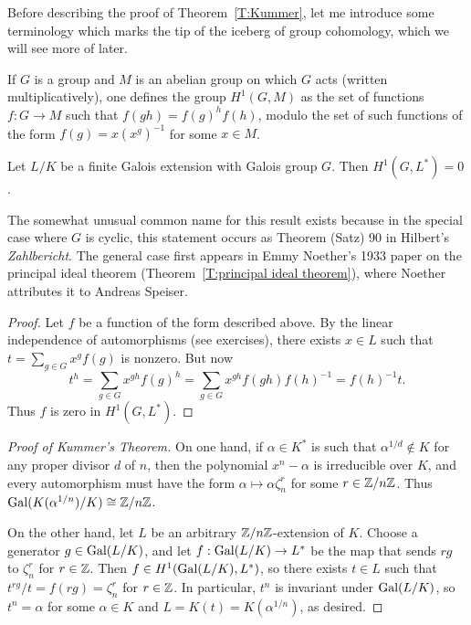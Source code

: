 Before describing the proof of Theorem~\ref{T:Kummer}, let me introduce some terminology which marks the tip of the iceberg of group cohomology, which we will see more of later.

If $G$ is a group and $M$ is an abelian group on which $G$ acts
(written multiplicatively),
one defines the group $H^1(G,M)$ as the set of functions $f:
G \to M$ such that $f(gh) = f(g)^h f(h)$, modulo the set of such
functions of the form $f(g) = x (x^g)^{-1}$ for some $x \in M$.

\begin{lemma}[``Theorem 90''] \label{L:theorem 90}
Let $L/K$ be a finite Galois extension with Galois group $G$.
Then $H^1(G, L^*) = 0$.
\end{lemma}
The somewhat unusual common name for this result exists because in the special case where $G$ is cyclic, this statement occurs as Theorem (Satz) 90 in Hilbert's \textit{Zahlbericht}. The general case first appears in Emmy Noether's 1933 paper on the principal ideal theorem (Theorem~\ref{T:principal ideal theorem}), where Noether attributes it to Andreas Speiser.

\begin{proof}
Let $f$ be a function of the form described above.
By the linear independence of automorphisms (see exercises),
there exists $x \in L$ such that $t = \sum_{g \in G} x^g f(g)$
is nonzero. But now
\[
t^h = \sum_{g \in G} x^{gh} f(g)^h =
\sum_{g \in G} x^{gh} f(gh) f(h)^{-1}
= f(h)^{-1} t.
\]
Thus $f$ is zero in $H^1(G,L^*)$.
\end{proof}

\begin{proof}[Proof of Kummer's Theorem]
On one hand, if $\alpha \in K^*$ is such that $\alpha^{1/d} \notin K$
for any proper divisor $d$ of $n$, then the polynomial $x^n - \alpha$
is irreducible over $K$, and every automorphism must have the form
$\alpha \mapsto \alpha \zeta_n^r$ for some $r \in \mathbb{Z}/n\mathbb{Z}$. Thus
$\operatorname{Gal}(K(\alpha^{1/n})/K) \cong \mathbb{Z}/n\mathbb{Z}$.

On the other hand,
let $L$ be an arbitrary
$\mathbb{Z}/n\mathbb{Z}$-extension of $K$. Choose a generator $g \in \operatorname{Gal}(L/K)$,
and let $f: \operatorname{Gal}(L/K) \to L^*$ be the map that sends $rg$ to $\zeta_n^r$
for $r \in \mathbb{Z}$.
Then $f \in H^1(\operatorname{Gal}(L/K), L^*)$, so there exists $t \in L$ such that
$t^{rg}/t = f(rg) = \zeta_n^r$ for $r \in \mathbb{Z}$. In particular,
$t^n$ is invariant under $\operatorname{Gal}(L/K)$, so $t^n = \alpha$ for some
$\alpha \in K$ and $L = K(t) = K(\alpha^{1/n})$, as desired.
\end{proof}

